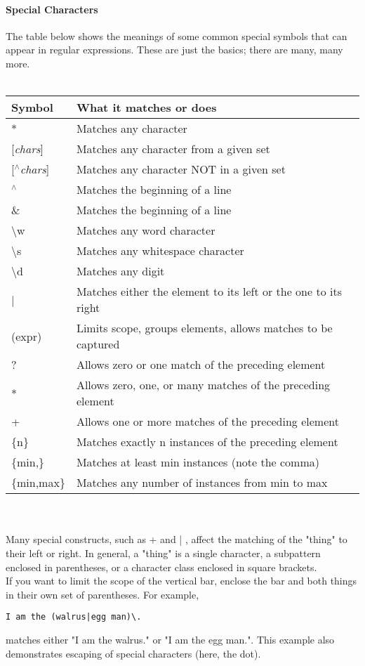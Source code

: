 \documentclass[10pt,letterpaper]{book}
\begin{document}
\paragraph*{Special Characters}
The table below shows the meanings of some common special symbols that can appear in regular expressions. These are just the basics; there are many, many more.\\
\\
\begin{tabular}{l l}
\hline
\textbf{Symbol} & \textbf{What it matches or does}\\
\hline 
* & Matches any character\\
{[}\textit{chars}{]} & Matches any character from a given set\\
{[}\textit{$ ^\wedge $chars}{]} & Matches any character NOT in a given set\\
$ ^\wedge $ & Matches the beginning of a line\\
\& & Matches the beginning of a line\\
\textbackslash w & Matches any word character\\
\textbackslash s & Matches any whitespace character\\
\textbackslash d & Matches any digit\\
\hline
| & Matches either the element to its left or the one to its right\\
(expr) & Limits scope, groups elements, allows matches to be captured\\
\hline
? & Allows zero or one match of the preceding element\\
* & Allows zero, one, or many matches of the preceding element\\
+ & Allows one or more matches of the preceding element\\
\{n\} & Matches exactly n instances of the preceding element\\
\{min,\} & Matches at least min instances (note the comma)\\
\{min,max\} & Matches any number of instances from min to max\\
\hline
\end{tabular}
\\
\\
Many special constructs, such as + and | , affect the matching of the "thing" to their left or right. In general, a "thing" is a single character, a subpattern enclosed in parentheses, or a character class enclosed in square brackets.\\
If you want to limit the scope of the vertical bar, enclose the bar and both things in their own set of parentheses. For example,
\begin{lstlisting}
I am the (walrus|egg man)\.
\end{lstlisting}
matches either "I am the walrus." or "I am the egg man.". This example also demonstrates escaping of special characters (here, the dot).
\end{document}
